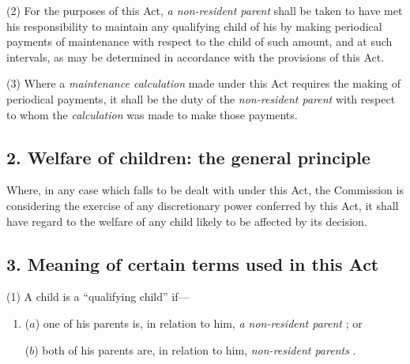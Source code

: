 \documentclass[12pt,a4paper]{article}
\begin{document}
(2) For the purposes of this Act, 
\emph{a non-resident parent}  %
shall be taken to have met his responsibility to maintain any qualifying child of his by making periodical payments of maintenance with respect to the child of such amount, and at such intervals, as may be determined in accordance with the provisions of this Act.

(3) Where a 
\emph{maintenance calculation}  %
made under this Act requires the making of periodical payments, it shall be the duty of the 
\emph{non-resident parent}  %
with respect to whom the 
\emph{calculation}  %
was made to make those payments.

\subsection{2. Welfare of children: the general principle}

Where, in any case which falls to be dealt with under this Act, the 
Commission  %
is considering the exercise of any discretionary power conferred by this Act, 
it  %
shall have regard to the welfare of any child likely to be affected by 
its  %
decision.


\subsection{3. Meaning of certain terms used in this Act}

(1) A child is a “qualifying child” if—
\begin{enumerate}\item[]
($a$) one of his parents is, in relation to him, 
\emph{a non-resident parent}%
; or

($b$) both of his parents are, in relation to him, 
\emph{non-resident parents}%
.
\end{enumerate}
\end{document}
